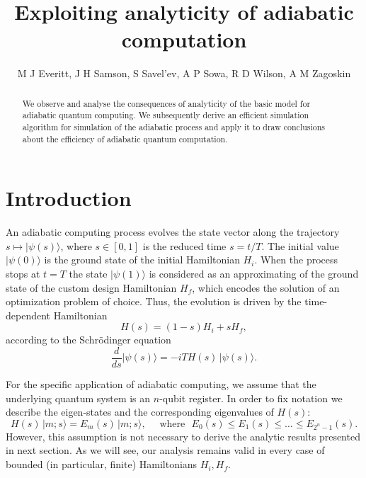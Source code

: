 \documentclass[11 pt]{article}
\begin{document}
\title{Exploiting analyticity of adiabatic computation}
\author{M J Everitt, J H Samson, S Savel'ev, A P Sowa, R D Wilson, A M Zagoskin }

\date{}
\maketitle
\newtheorem{definition}{Definition}[section]
\newtheorem{theorem}{Theorem}[section]
\newtheorem{lemma}{Lemma}[section]
\newtheorem{corollary}{Corollary}[section]

\begin{abstract}
We observe and analyse the consequences of analyticity of the basic model for adiabatic quantum computing. We subsequently derive an efficient simulation algorithm for simulation of the adiabatic process and apply it to draw conclusions about the efficiency of adiabatic quantum computation.
\end{abstract}

\section{Introduction}

An adiabatic computing process evolves the state vector along the trajectory $s\mapsto |\psi(s)\rangle$, where $s\in[0,1]$ is the reduced time $s=t/T$. The initial value $|\psi(0)\rangle$ is the ground state of the initial Hamiltonian $H_i$. When the process stops at $t=T$ the state $|\psi(1)\rangle$ is considered as an approximating of the ground state of the custom design Hamiltonian $H_f$, which encodes the solution of an optimization problem of choice. Thus, the evolution is driven by the time-dependent Hamiltonian
\begin{equation}\label{Ham_of_s}
H(s) = (1-s) H_i +s H_f,
\end{equation}
according to the Schr\"{o}dinger equation
\begin{equation}\label{Schr_of_s}
\frac{d}{ds} |\psi(s)\rangle= -iTH(s)\,|\psi(s)\rangle.
\end{equation}

For the specific application of adiabatic computing, we assume that the underlying quantum system is an $n$-qubit register. In order to fix notation we describe the eigen-states and the corresponding eigenvalues of $H(s)$:
\begin{equation}
H(s) \,|m;s\rangle = E_m(s)\,|m;s\rangle,\quad  \mbox{ where }\,\, E_0(s)\leq E_1(s) \leq \ldots \leq E_{2^n-1}(s).
\end{equation}
However, this assumption is not necessary to derive the analytic results presented in next section. As we will see, our analysis remains valid in every case of bounded (in particular, finite) Hamiltonians $H_i, H_f$.
\end{document}
